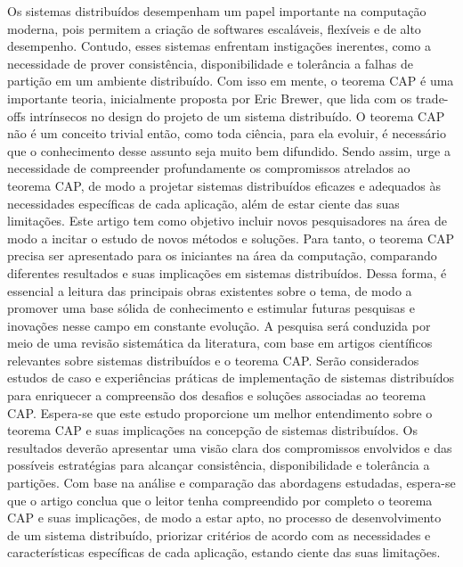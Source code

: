 
\begin{resumoutfpr}%
Os sistemas distribuídos desempenham um papel importante na computação moderna, pois permitem a criação de softwares escaláveis, flexíveis e de alto desempenho. Contudo, esses sistemas enfrentam instigações inerentes, como a necessidade de prover consistência, disponibilidade e tolerância a falhas de partição em um ambiente distribuído. Com isso em mente, o teorema CAP é uma importante teoria, inicialmente proposta por Eric Brewer, que lida com os trade-offs intrínsecos no design do projeto de um sistema distribuído.
O teorema CAP não é um conceito trivial então, como toda ciência, para ela evoluir, é necessário que o conhecimento desse assunto seja muito bem difundido. Sendo assim, urge a necessidade de compreender profundamente os compromissos atrelados ao teorema CAP, de modo a projetar sistemas distribuídos eficazes e adequados às necessidades específicas de cada aplicação, além de estar ciente das suas limitações.
Este artigo tem como objetivo incluir novos pesquisadores na área de modo a incitar o estudo de novos métodos e soluções. Para tanto, o teorema CAP precisa ser apresentado para os iniciantes na área da computação, comparando diferentes resultados e suas implicações em sistemas distribuídos. Dessa forma, é essencial a leitura das principais obras existentes sobre o tema, de modo a promover uma base sólida de conhecimento e estimular futuras pesquisas e inovações nesse campo em constante evolução. 
A pesquisa será conduzida por meio de uma revisão sistemática da literatura, com base em artigos científicos relevantes sobre sistemas distribuídos e o teorema CAP. Serão considerados estudos de caso e experiências práticas de implementação de sistemas distribuídos para enriquecer a compreensão dos desafios e soluções associadas ao teorema CAP. 
Espera-se que este estudo proporcione um melhor entendimento sobre o teorema CAP e suas implicações na concepção de sistemas distribuídos. Os resultados deverão apresentar uma visão clara dos compromissos envolvidos e das possíveis estratégias para alcançar consistência, disponibilidade e tolerância a partições.
Com base na análise e comparação das abordagens estudadas, espera-se que o artigo conclua que o leitor tenha compreendido por completo o teorema CAP e suas implicações, de modo a estar apto, no processo de desenvolvimento de um sistema distribuído, priorizar critérios de acordo com as necessidades e características específicas de cada aplicação, estando ciente das suas limitações. 
\end{resumoutfpr}
